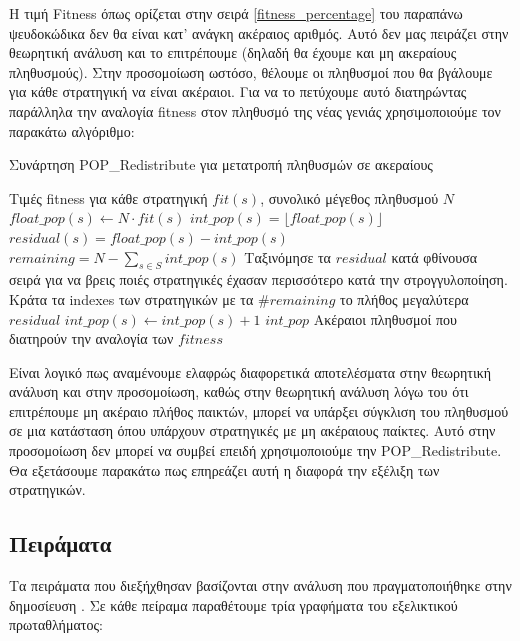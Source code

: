 \documentclass[12pt]{report}
\begin{document}
Η τιμή \foreignlanguage{english}{Fitness} όπως ορίζεται στην σειρά \ref{fitness_percentage} του παραπάνω ψευδοκώδικα δεν θα είναι κατ' ανάγκη ακέραιος αριθμός. Αυτό δεν μας πειράζει στην θεωρητική ανάλυση και το επιτρέπουμε (δηλαδή θα έχουμε και μη ακεραίους πληθυσμούς). Στην προσομοίωση ωστόσο, θέλουμε οι πληθυσμοί που θα βγάλουμε για κάθε στρατηγική να είναι ακέραιοι. Για να το πετύχουμε αυτό διατηρώντας παράλληλα την αναλογία \foreignlanguage{english}{fitness} στον πληθυσμό της νέας γενιάς χρησιμοποιούμε τον παρακάτω αλγόριθμο:
\begin{algorithm}[H]
\caption{Συνάρτηση \foreignlanguage{english}{POP\_Redistribute} για μετατροπή πληθυσμών σε ακεραίους}
\label{alg:PopRedist}
\begin{algorithmic}[1]
    \REQUIRE Τιμές \foreignlanguage{english}{fitness} για κάθε στρατηγική $fit(s)$, συνολικό μέγεθος πληθυσμού $N$
    \STATE $float\_pop(s) \gets N\cdot fit(s)$
    \STATE $int\_pop(s) = \lfloor {float\_pop(s)} \rfloor$
    \STATE $residual(s) = float\_pop(s) - int\_pop(s)$
    \ENDFOR
    \STATE $remaining = N - \sum_{s \in S}{int\_pop(s)}$ 
    \STATE Ταξινόμησε τα $residual$ κατά φθίνουσα σειρά για να βρεις ποιές στρατηγικές έχασαν περισσότερο κατά την στρογγυλοποίηση. 
    \STATE Κράτα τα \foreignlanguage{english}{indexes} των στρατηγικών με τα $\#remaining$ το πλήθος μεγαλύτερα $residual$
    \STATE $int\_pop(s) \gets int\_pop(s)+1$
    \ENDFOR
    \RETURN $int\_pop$ \COMMENT Ακέραιοι πληθυσμοί που διατηρούν την αναλογία των $fitness$
\end{algorithmic}
\end{algorithm}
Είναι λογικό πως αναμένουμε ελαφρώς διαφορετικά αποτελέσματα στην θεωρητική ανάλυση και στην προσομοίωση, καθώς στην θεωρητική ανάλυση λόγω του ότι επιτρέπουμε μη ακέραιο πλήθος παικτών, μπορεί να υπάρξει σύγκλιση του πληθυσμού σε μια κατάσταση όπου υπάρχουν στρατηγικές με μη ακέραιους παίκτες. Αυτό στην προσομοίωση δεν μπορεί να συμβεί επειδή χρησιμοποιούμε την \foreignlanguage{english}{POP\_Redistribute}. Θα εξετάσουμε παρακάτω πως επηρεάζει αυτή η διαφορά την εξέλιξη των στρατηγικών.

\subsection{Πειράματα}
Τα πειράματα που διεξήχθησαν βασίζονται στην ανάλυση που πραγματοποιήθηκε στην δημοσίευση \cite{mathieu1999}. Σε κάθε πείραμα παραθέτουμε τρία γραφήματα του εξελικτικού πρωταθλήματος:
\end{document}
